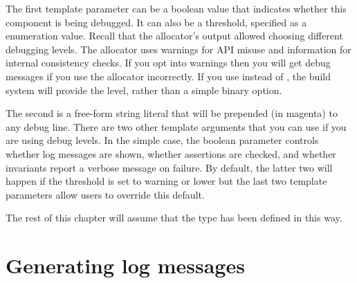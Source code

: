 \codelisting[filename=examples/debug_helpers/example.cc,marker=debug_type,label=lst:usingdebug,caption="Connecting the debug option to a debug type in code"]{}

The first template parameter can be a boolean value that indicates whether this component is being debugged.
It can also be a threshold, specified as a  enumeration value.
Recall that the allocator's output allowed choosing different debugging levels.
The allocator uses warnings for API misuse and information for internal consistency checks.
If you opt into warnings then you will get debug messages if you use the allocator incorrectly.
If you use  instead of , the build system will provide the level, rather than a simple binary option.

The second is a free-form string literal that will be prepended (in magenta) to any debug line.
There are two other template arguments that you can use if you are using debug levels.
In the simple case, the boolean parameter controls whether log messages are shown, whether assertions are checked, and whether invariants report a verbose message on failure.
By default, the latter two will happen if the threshold is set to warning or lower but the last two template parameters allow users to override this default.

The rest of this chapter will assume that the  type has been defined in this way.

\section{Generating log messages}

